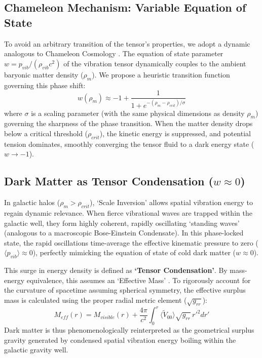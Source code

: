 \documentclass[reprint,amsmath,amssymb,aps,prd]{revtex4-2}
\begin{document}
\subsection{Chameleon Mechanism: Variable Equation of State}
To avoid an arbitrary transition of the tensor's properties, we adopt a dynamic analogous to Chameleon Cosmology \cite{Khoury2004}. The equation of state parameter $w = p_{vib} / (\rho_{vib} c^2)$ of the vibration tensor dynamically couples to the ambient baryonic matter density ($\rho_m$). We propose a heuristic transition function governing this phase shift:
\begin{equation}
w(\rho_m) \approx -1 + \frac{1}{1 + e^{-(\rho_m - \rho_{crit})/\sigma}}
\end{equation}
where $\sigma$ is a scaling parameter (with the same physical dimensions as density $\rho_m$) governing the sharpness of the phase transition. When the matter density drops below a critical threshold ($\rho_{crit}$), the kinetic energy is suppressed, and potential tension dominates, smoothly converging the tensor fluid to a dark energy state ($w \to -1$).

\subsection{Dark Matter as Tensor Condensation ($w \approx 0$)}
In galactic halos ($\rho_m > \rho_{crit}$), `Scale Inversion' allows spatial vibration energy to regain dynamic relevance. When fierce vibrational waves are trapped within the galactic well, they form highly coherent, rapidly oscillating `standing waves' (analogous to a macroscopic Bose-Einstein Condensate). In this phase-locked state, the rapid oscillations time-average the effective kinematic pressure to zero ($\langle p_{vib} \rangle \approx 0$), perfectly mimicking the equation of state of cold dark matter ($w \approx 0$).

This surge in energy density is defined as \textbf{`Tensor Condensation'}. By mass-energy equivalence, this assumes an `Effective Mass' \cite{Verlinde2017}. To rigorously account for the curvature of spacetime assuming spherical symmetry, the effective surplus mass is calculated using the proper radial metric element ($\sqrt{g_{rr}}$):
\begin{equation}
M_{eff}(r) = M_{visible}(r) + \frac{4\pi}{c^2} \int_{0}^{r} \langle \tilde{V}_{00} \rangle \sqrt{g_{rr}} \, r'^2 dr'
\end{equation}
Dark matter is thus phenomenologically reinterpreted as the geometrical surplus gravity generated by condensed spatial vibration energy boiling within the galactic gravity well.
\end{document}
